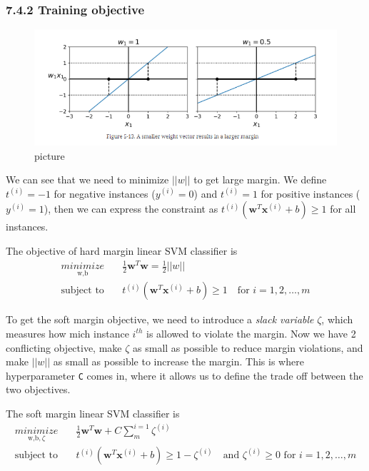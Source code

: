 \documentclass[
  letterpaper,
  DIV=11,
  numbers=noendperiod]{scrartcl}
\begin{document}
\subsubsection{7.4.2 Training objective}\label{training-objective}

\begin{figure}[H]

{\centering \includegraphics{8.png}

}

\caption{picture}

\end{figure}%

We can see that we need to minimize \(||w||\) to get large margin. We
define \(t^{(i)} = -1\) for negative instances (\(y^{(i)} =0\)) and
\(t^{(i)} = 1\) for positive instances (\(y^{(i)} =1\)), then we can
express the constraint as
\(t^{(i)}(\mathbf{w}^T \mathbf{x}^{(i)} + b) \geq 1\) for all instances.

The objective of hard margin linear SVM classifier is \[
\begin{align*}
\underset{\text{w,b}}{minimize}\quad & \frac{1}{2} \mathbf{w}^T \mathbf{w}  = \frac{1}{2}||w|| \\
\text{subject to} \quad & t^{(i)} \left( \mathbf{w}^T \mathbf{x}^{(i)} + b \right) \geq 1 \quad \text{for } i = 1, 2, \dots, m
\end{align*}
\]

To get the soft margin objective, we need to introduce a \emph{slack
variable} \(\zeta\), which measures how mich instance \(i^{th}\) is
allowed to violate the margin. Now we have 2 conflicting objective, make
\(\zeta\) as small as possible to reduce margin violations, and make
\(||w||\) as small as possible to increase the margin. This is where
hyperparameter \texttt{C} comes in, where it allows us to define the
trade off between the two objectives.

The soft margin linear SVM classifier is \[
\begin{align*}
\underset{\text{w,b},\zeta}{minimize} \quad & \frac{1}{2} \mathbf{w}^T \mathbf{w}  + C\sum_m^{i=1}\zeta^{(i)} \\
\text{subject to} \quad & t^{(i)} \left( \mathbf{w}^T\mathbf{x}^{(i)} + b \right) \geq 1 - \zeta^{(i)} \quad \text{and } \zeta^{(i)} \geq 0 \text{ for } i = 1, 2, \dots, m
\end{align*}
\]
\end{document}
